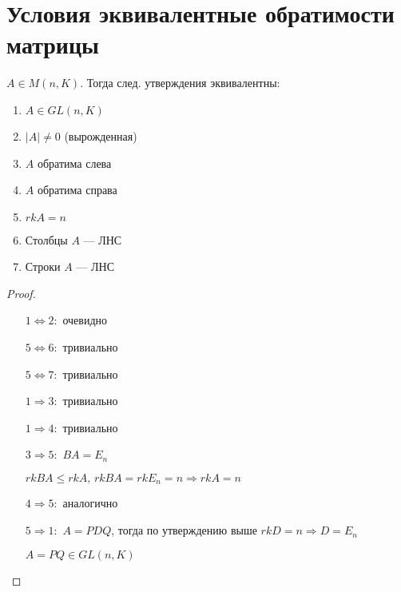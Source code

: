 \section{Условия эквивалентные обратимости матрицы}

\begin{theorem-non} 
    
    $A \in M(n, K)$. Тогда след. утверждения эквивалентны:

    \begin{enumerate}
        \item $A \in GL(n, K)$
        \item $|A| \neq 0$ (вырожденная)
        \item $A$ обратима слева
        \item $A$ обратима справа
        \item $rk A = n$
        \item Столбцы $A$ --- ЛНС
        \item Строки $A$ --- ЛНС
    \end{enumerate}

    \begin{proof}
        \
        \begin{itemize}
            \item[$1 \Leftrightarrow 2:$] очевидно
            \item[$5 \Leftrightarrow 6:$] тривиально
            \item[$5 \Leftrightarrow 7:$] тривиально 
            \item[$1 \Rightarrow 3:$] тривиально 
            \item[$1 \Rightarrow 4:$] тривиально 
            \item[$3 \Rightarrow 5:$] $BA = E_n$
            
            $rk BA \leq rk A,\, rk BA = rk E_n = n \Longrightarrow rk A = n$

            \item[$4 \Rightarrow 5:$] аналогично
            \item[$5 \Rightarrow 1:$] $A = PDQ$, тогда по утверждению выше $rk D = n \Longrightarrow D = E_n$
            
            $A = PQ \in GL(n, K)$
        \end{itemize}

    \end{proof}

\end{theorem-non}


